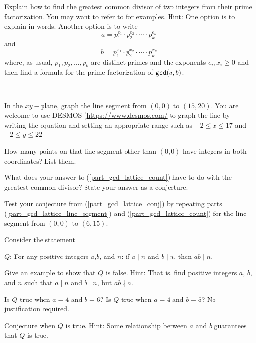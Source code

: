 \begin{exer}[\exerE] %
\label{exer_gcd_from_prime_fact_conjecture}
    Explain how to find the greatest common divisor of two integers from their prime factorization.  You may want to refer to  for examples. Hint: One option is to explain in words.  Another option is to write $$a = p_1^{e_1} \cdot p_2^{e_2} \cdot \cdots \cdot p_k^{e_k}$$ and $$b = p_1^{x_1} \cdot p_2^{x_2} \cdot \cdots \cdot p_k^{x_k}$$
    where, as usual, $p_1, p_2, \ldots, p_k$ are distinct primes and the exponents $e_i, x_i \ge 0$ and then find a formula for the prime factorization of $\texttt{gcd}(a,b)$. 
\end{exer}

\begin{exer}[\exerE] %
\label{exer_gcd_integer_points_on_line}
~
    \begin{exerpart}
        \item \label{part_gcd_lattice_line_segment} In the $xy-$plane, graph the line segment from $(0,0)$ to $(15,20)$.  You are welcome to use DESMOS (\url{https://www.desmos.com/} to graph the line by writing the equation and setting an appropriate range such as $-2 \le x \le 17$ and $-2 \le y \le 22$.  
        \item \label{part_gcd_lattice_count} How many points on that line segment other than $(0,0)$ have integers in both coordinates?  List them. %
        \item \label{part_gcd_lattice_conj} What does your answer to (\ref{part_gcd_lattice_count}) have to do with the greatest common divisor? State your answer as a conjecture.
        \item Test your conjecture from (\ref{part_gcd_lattice_conj}) by repeating parts (\ref{part_gcd_lattice_line_segment}) and (\ref{part_gcd_lattice_count}) for the line segment from $(0,0)$ to $(6,15)$.  
    \end{exerpart}
\end{exer}

\begin{exer} [\exerE] %
\label{exer_product_divides}
    Consider the statement
        \begin{center}
            $Q$: For any positive integers $a$,$b$, and $n$: if $a \mid n$ and $b \mid n$, then $ab \mid n$.
        \end{center}
        \begin{exerpart}
            \item Give an example to show that $Q$ is false.  Hint: That is, find positive integers $a$, $b$, and $n$ such that $a \mid n$ and $b \mid n$, but $ab \nmid n$.
            \item Is $Q$ true when $a = 4$ and $b = 6$?  Is $Q$ true when $a = 4$ and $b = 5$? No justification required.
            \item Conjecture when $Q$ is true.  Hint: Some relationship between $a$ and $b$ guarantees that $Q$ is true.
        \end{exerpart}
\end{exer}

